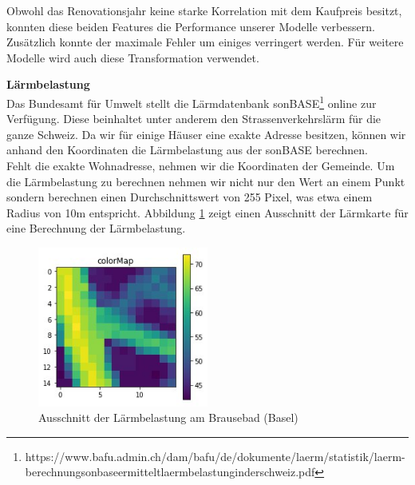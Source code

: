 \begin{table}[ht]
\centering
{}
\caption{Ergebnisse mit Einbezug der Renovation}
\label{tab:third_round}
\end{table}

Obwohl das Renovationsjahr keine starke Korrelation mit dem Kaufpreis besitzt, konnten diese beiden Features die Performance unserer Modelle verbessern. Zusätzlich konnte der maximale Fehler um einiges verringert werden. Für weitere Modelle wird auch diese Transformation verwendet.

\textbf{Lärmbelastung}\\
Das Bundesamt für Umwelt stellt die Lärmdatenbank sonBASE\footnote{https://www.bafu.admin.ch/dam/bafu/de/dokumente/laerm/statistik/laerm-berechnungsonbaseermitteltlaermbelastunginderschweiz.pdf} online zur Verfügung. Diese beinhaltet unter anderem den Strassenverkehrslärm für die ganze Schweiz. Da wir für einige Häuser eine exakte Adresse besitzen, können wir anhand den Koordinaten die Lärmbelastung aus der sonBASE berechnen.\\
Fehlt die exakte Wohnadresse, nehmen wir die Koordinaten der Gemeinde. Um die Lärmbelastung zu berechnen nehmen wir nicht nur den Wert an einem Punkt sondern berechnen einen Durchschnittswert von 255 Pixel, was etwa einem Radius von 10m entspricht. Abbildung \ref{fig:noise} zeigt einen Ausschnitt der Lärmkarte für eine Berechnung der Lärmbelastung.

\begin{figure}[ht]
\centering
\includegraphics[width=0.5\textwidth]{images/noise.jpeg}
\caption[Ausschnitt der Lärmbelastung am Brausebad (Basel)]{Ausschnitt der Lärmbelastung am Brausebad (Basel)}
\label{fig:noise}
\end{figure}



